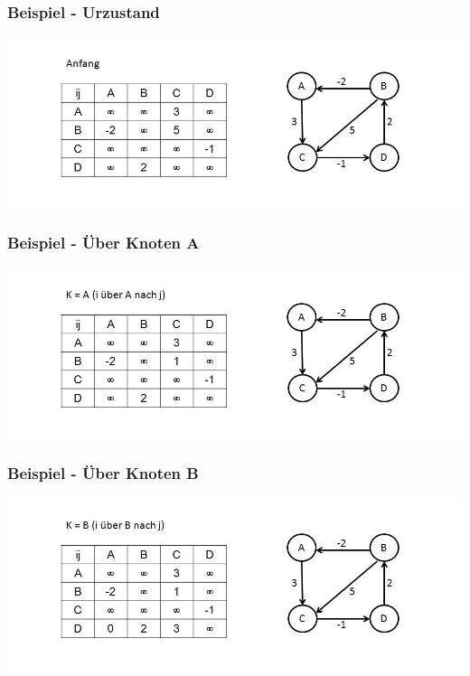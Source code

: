 
\begin{frame}
\frametitle{Beispiel - Urzustand}

\includegraphics[width=\linewidth]{floyd_warshall_graphs/graph1.JPG}

\end{frame}


\begin{frame}
\frametitle{Beispiel - Über Knoten A}

\includegraphics[width=\linewidth]{floyd_warshall_graphs/graph2.JPG}

\end{frame}


\begin{frame}
\frametitle{Beispiel - Über Knoten B}

\includegraphics[width=\linewidth]{floyd_warshall_graphs/graph3.JPG}

\end{frame}

